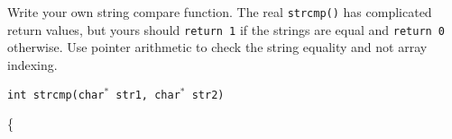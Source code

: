 \documentclass[12pt]{exam}
\begin{document}
\begin{questions}
\question
Write your own string compare function.
The real {\tt strcmp()} has complicated return values, but yours should {\tt return 1} if the strings are equal and {\tt return 0} otherwise.
Use pointer arithmetic to check the string equality and not array indexing.

{\tt int strcmp(char$^*$ str1, char$^*$ str2)

\{ }

\end{questions}
\end{document}
